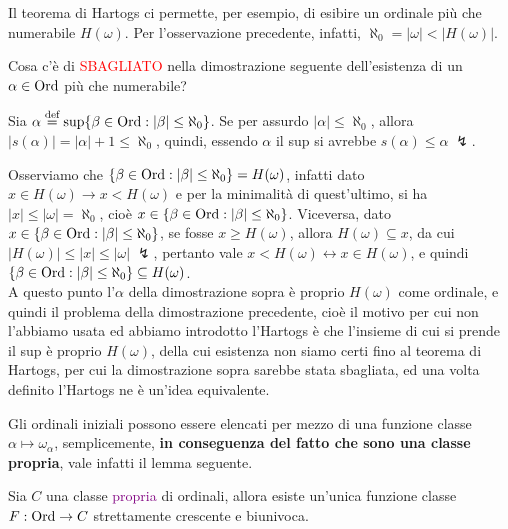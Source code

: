Il teorema di Hartogs ci permette, per esempio, di esibire un ordinale più che numerabile $H(\omega)$. Per l'osservazione precedente, infatti, $\aleph_0 = |\omega| < |H(\omega)|$.

\begin{exercise}
	Cosa c'è di \textcolor{red}{SBAGLIATO} nella dimostrazione seguente dell'esistenza di un $\alpha \in \operatorname{Ord}$ più che numerabile?
\end{exercise}

Sia $\alpha \overset{\text{def}}{=} \sup\{\beta \in \operatorname{Ord} : |\beta| \leq \aleph_0\}$. Se per assurdo $|\alpha| \leq \aleph_0$, allora $|s(\alpha)| = |\alpha| + 1 \leq \aleph_0$, quindi, essendo $\alpha$ il sup si avrebbe $s(\alpha) \leq \alpha \;\lightning$.

\begin{soln}
	Osserviamo che $\{\beta \in \operatorname{Ord} : |\beta| \leq \aleph_0\} = H(\omega)$, infatti dato $x \in H(\omega) \to x < H(\omega)$ e per la minimalità di quest'ultimo, si ha $|x| \leq |\omega| = \aleph_0$, cioè $x \in \{\beta \in \operatorname{Ord} : |\beta| \leq \aleph_0\}$. Viceversa, dato $x \in \{\beta \in \operatorname{Ord} : |\beta| \leq \aleph_0\}$,
	se fosse $x \geq H(\omega)$, allora $H(\omega) \subseteq x$, da cui $|H(\omega)| \leq |x| \leq |\omega| \; \lightning$, pertanto vale $x < H(\omega) \leftrightarrow x \in H(\omega)$, e quindi $\{\beta \in \operatorname{Ord} : |\beta| \leq \aleph_0\} \subseteq H(\omega)$.\\
	A questo punto l'$\alpha$ della dimostrazione sopra è proprio $H(\omega)$ come ordinale, e quindi il problema della dimostrazione precedente, cioè il motivo per cui non l'abbiamo usata ed abbiamo introdotto l'Hartogs è che l'insieme di cui si prende il sup è proprio $H(\omega)$, della cui esistenza non siamo certi fino al teorema di Hartogs,
	per cui la dimostrazione sopra sarebbe stata sbagliata, ed una volta definito l'Hartogs ne è un'idea equivalente.
\end{soln}

Gli ordinali iniziali possono essere elencati per mezzo di una funzione classe $\alpha \mapsto \omega_\alpha$, semplicemente, \textbf{in conseguenza del fatto che sono una classe propria}, vale infatti il lemma seguente.

\begin{lemma}[$F : \Ord \to C$]
	Sia $C$ una classe \textcolor{purple}{propria} di ordinali, allora esiste un'unica funzione classe $F : \operatorname{Ord} \rightarrow C$ strettamente crescente e biunivoca.
\end{lemma}

